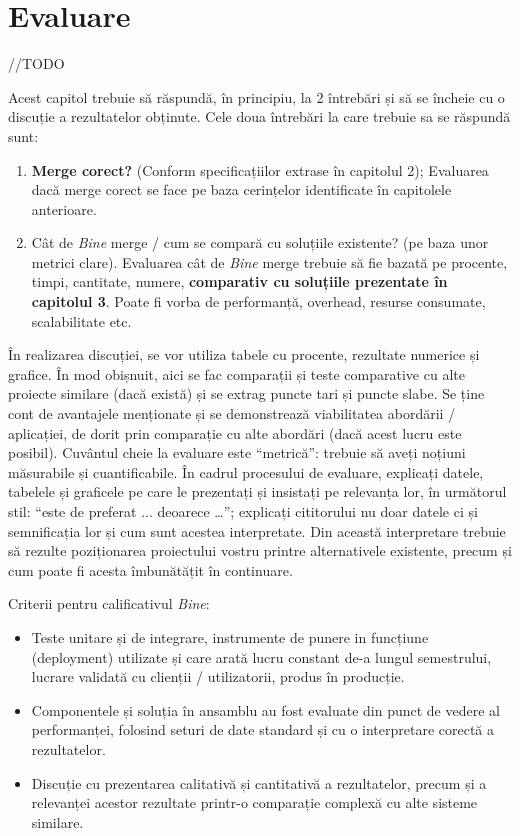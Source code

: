 \documentclass[12pt,a4paper]{report}
\newcommand{\worktype}[1]{[\textit{#1}] }
\newcommand{\dezvoltare}{\worktype{Dezvoltare de produs}}
\newcommand{\cercetare}{\worktype{Cercetare}}
\newcommand{\ambele}{\worktype{Ambele}}
\numberwithin{equation}{section} %
\begin{document}
\chapter{\label{sec:evaluare}Evaluare}

//TODO

Acest capitol trebuie să răspundă, în principiu, la 2 întrebări și să se încheie cu o discuție a rezultatelor obținute. Cele doua întrebări la care trebuie sa se răspundă sunt:
\begin{enumerate}
	\item  \textbf{Merge corect?} (Conform specificațiilor extrase în capitolul 2);
	      Evaluarea dacă merge corect se face pe baza cerințelor identificate în capitolele anterioare.

	\item Cât de \textit{Bine} merge / cum se compară cu soluțiile existente? (pe baza unor metrici clare).
	      Evaluarea cât de \textit{Bine} merge trebuie să fie bazată pe procente, timpi, cantitate, numere, \textbf{comparativ cu soluțiile prezentate în capitolul 3}. Poate fi vorba de performanță, overhead, resurse consumate, scalabilitate etc.
\end{enumerate}

În realizarea discuției, se vor utiliza tabele cu procente, rezultate numerice și grafice. În mod obișnuit, aici se fac comparații și teste comparative cu alte proiecte similare (dacă există) și se extrag puncte tari și puncte slabe. Se ține cont de avantajele menționate și se demonstrează viabilitatea abordării / aplicației, de dorit prin comparație cu alte abordări (dacă acest lucru este posibil). Cuvântul cheie la evaluare este ``metrică'': trebuie să aveți noțiuni măsurabile și cuantificabile. În cadrul procesului de evaluare, explicați datele, tabelele și graficele pe care le prezentați și insistați pe relevanța lor, în următorul stil: ``este de preferat ... deoarece …''; explicați cititorului nu doar datele ci și semnificația lor și cum sunt acestea interpretate. Din această interpretare trebuie să rezulte poziționarea proiectului vostru printre alternativele existente, precum și cum poate fi acesta îmbunătățit în continuare.

Criterii pentru calificativul \textit{Bine}:
\begin{itemize}
	\item \dezvoltare Teste unitare și de integrare, instrumente de punere in funcțiune (deployment) utilizate și care arată lucru constant de-a lungul semestrului, lucrare validată cu clienții / utilizatorii, produs în producție.
	\item \cercetare Componentele și soluția în ansamblu au fost evaluate din punct de vedere al performanței, folosind seturi de date standard și cu o interpretare corectă a rezultatelor.
	\item \ambele Discuție cu prezentarea calitativă și cantitativă a rezultatelor, precum și a relevanței acestor rezultate printr-o comparație complexă cu alte sisteme similare.
\end{itemize}
\end{document}
